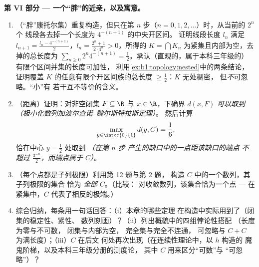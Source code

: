 \begin{problem}[{周末问题 --- 康托尔三分集：
长度为零、不可数、完备，且 $C + C =
\intcc{0}{2}$}]
\medskip
\noindent\textbf{第 VI 部分 --- 一个“胖”的近亲，以及寓意。}
\begin{enumerate}[resume]
  \item （“胖”康托尔集）重复构造，但只在第
        $n$ 步（$n = 0, 1, 2, \dots$）时，从当前的 $2^n$ 个
        线段各去掉一个长度为 $4^{-(n+1)}$ 的中央开区间。
        证明线段长度 $l_n$ 满足
        $l_{n+1} = \frac{l_n - 4^{-(n+1)}}{2}$，$l_n =
        \frac{2^n + 1}{2\cdot 4^n} > 0$，所得的
        $K = \bigcap K_n$ 为紧集且内部为空，去掉的总长度为
        $\sum_{n\geq0} 2^n
        4^{-(n+1)} = \frac12$。承认（直观的，属于本科三年级的）
        有限个区间并集的长度可加性，
        利用\cref{ex:b1:topology:nested}中的两条结论，
        证明覆盖 $K$ 的任意有限个开区间族的总长度
        $\geq \frac12$：$K$ 无处稠密，
        但\emph{不}可忽略。“小”有
        若干互不等价的含义。
  \item （距离）证明：对非空闭集 $F \subseteq
        \R$ 与 $x \in \R$，下确界 $d(x, F)$
        \emph{可以取到}\emph{（极小化数列加波尔查诺--魏尔斯特拉斯定理）}。
        然后计算
        \[
        \max_{y \in \intcc{0}{1}} d(y, C) = \frac16 ,
        \]
        恰在中心 $y = \frac12$ 处取到 \emph{（在第 $n$ 步
        产生的缺口中的一点距该缺口的端点
        不超过 $\frac{3^{-n}}{2}$，而端点属于
        $C$）}。
  \item （每个点都是子列极限）利用第 12 题与第 2 题，
        构造 $C$ 中的一个数列，其子列极限的集合
        恰为 \emph{全部} $C$。（比较：
        对收敛数列，该集合恰为一个点 ---
        在紧集中，$C$ 代表了相反的极端。）
  \item 综合归纳，每条用一句话回答：（i）本章的哪些定理
        在构造中实际用到了（闭集的稳定性、紧性、
        数列刻画）？（ii）列出概貌中的四组悖论性搭配
        （长度为零与不可数，
        闭集与内部为空，
        完全集与完全不连通，
        可忽略与 $C+C$ 为满长度）；（iii）$C$ 在后文
        何处再次出现（在连续性理论中，以 $h$ 构造的
        魔鬼阶梯，以及本科三年级分册的测度论，
        其中 $C$ 用来区分“可数”与
        “可忽略”）？
\end{enumerate}
\end{problem}

